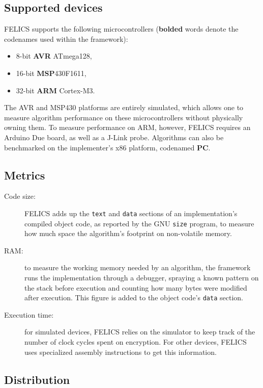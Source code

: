 \documentclass{article}
\begin{document}
\subsection{Supported devices}
\label{sec:felics/devices}

FELICS supports the following microcontrollers (\textbf{bolded} words
denote the codenames used within the framework):

\begin{itemize}
\item 8-bit \textbf{AVR} ATmega128,
\item 16-bit \textbf{MSP}430F1611,
\item 32-bit \textbf{ARM} Cortex-M3.
\end{itemize}

The AVR and MSP430 platforms are entirely simulated, which allows one
to measure algorithm performance on these microcontrollers without
physically owning them.  To measure performance on ARM, however,
FELICS requires an Arduino Due board, as well as a J-Link probe.
Algorithms can also be benchmarked on the implementer's x86 platform,
codenamed \textbf{PC}.

\subsection{Metrics}
\label{sec:felics/metrics}

\begin{description}
\item[Code size:] FELICS adds up the \texttt{text} and \texttt{data}
  sections of an implementation's compiled object code, as reported by
  the GNU \texttt{size} program, to measure how much space the
  algorithm's footprint on non-volatile memory.

\item[RAM:] to measure the working memory needed by an algorithm, the
  framework runs the implementation through a debugger, spraying a
  known pattern on the stack before execution and counting how many
  bytes were modified after execution.  This figure is added to the
  object code's \texttt{data} section.

\item[Execution time:] for simulated devices, FELICS relies on the
  simulator to keep track of the number of clock cycles spent on
  encryption.  For other devices, FELICS uses specialized assembly
  instructions to get this information.
\end{description}
\subsection{Distribution}
\label{sec:felics/dist}
\end{document}
